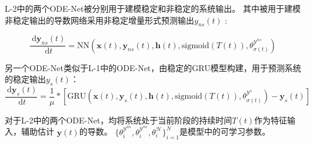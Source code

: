 L-2中的两个ODE-Net被分别用于建模稳定和非稳定的系统输出。
其中被用于建模非稳定输出的导数网络采用非稳定增量形式预测输出$y_{ns}(t)$ :

\begin{equation}
    \label{equ:dyns}
    \frac{\mathrm{~d} \boldsymbol{y}_{ns}(t)}{\mathrm{~d}t} = \text{NN}(\boldsymbol{x}(t),\boldsymbol{y}_{ns}(t), \boldsymbol{h}(t), \text{sigmoid}(T(t)), \theta^{\mathcal{Y}^{ns}}_{\sigma(t)})
\end{equation}

另一个ODE-Net类似于L-1中的ODE-Net，由稳定的GRU模型构建，用于预测系统的稳定输出$y_s(t)$：
\begin{equation}
    \label{equ:dys}
    \frac{\mathrm{~d} \boldsymbol{y}_{s}(t)}{\mathrm{~d}t} = \frac{1}{\mu}*\left[\text{GRU}(\boldsymbol{x}(t),\boldsymbol{y}_s(t), \boldsymbol{h}(t), \text{sigmoid}(T(t)), \theta^{\mathcal{Y}^{s}}_{\sigma(t)}) - \boldsymbol{y}_s(t)\right]
\end{equation}

对于L-2中的两个ODE-Net，均将系统处于当前阶段的持续时间$T(t)$作为特征输入，辅助估计 $\boldsymbol{y}(t)$的导数。
$\{\theta_i^{\mathcal{Y}^{ns}},\theta_i^{\mathcal{Y}^{ns}},\theta_i^{\mathcal{H}}\}_{i=1}^N$是模型中的可学习参数。

